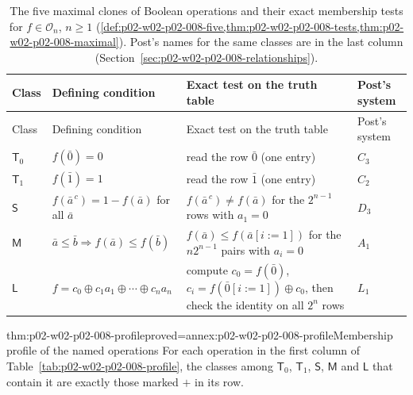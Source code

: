 \begingroup\small
\begin{longtable}{@{}p{}p{}p{}p{}@{}}
\caption{The five maximal clones of Boolean operations and their exact
membership tests for \(f\in\mathcal O_n\), \(n\geq1\)
(\cref{def:p02-w02-p02-008-five,thm:p02-w02-p02-008-tests,thm:p02-w02-p02-008-maximal}).
Post's names for the same classes are in the last column
(Section~\ref{sec:p02-w02-p02-008-relationships}).}
\label{tab:p02-w02-p02-008-tests}\\
\toprule
Class & Defining condition & Exact test on the truth table & Post's system \\
\midrule\endfirsthead
\toprule
Class & Defining condition & Exact test on the truth table & Post's system \\
\midrule\endhead
\(\mathsf T_0\) & \(f(\bar0)=0\) & read the row \(\bar0\) (one entry) & \(C_3\) \\
\(\mathsf T_1\) & \(f(\bar1)=1\) & read the row \(\bar1\) (one entry) & \(C_2\) \\
\(\mathsf S\) & \(f(\bar a^{\,c})=1-f(\bar a)\) for all \(\bar a\)
 & \(f(\bar a^{\,c})\neq f(\bar a)\) for the \(2^{n-1}\) rows with
   \(a_1=0\) & \(D_3\) \\
\(\mathsf M\) & \(\bar a\leq\bar b\Rightarrow f(\bar a)\leq f(\bar b)\)
 & \(f(\bar a)\leq f(\bar a[i{:=}1])\) for the \(n2^{n-1}\) pairs with
   \(a_i=0\) & \(A_1\) \\
\(\mathsf L\) & \(f=c_0\oplus c_1a_1\oplus\cdots\oplus c_na_n\)
 & compute \(c_0=f(\bar0)\), \(c_i=f(\bar0[i{:=}1])\oplus c_0\), then
   check the identity on all \(2^n\) rows & \(L_1\) \\
\bottomrule
\end{longtable}
\endgroup

\begin{hblemma}{thm:p02-w02-p02-008-profile}{proved=annex:p02-w02-p02-008-profile}{Membership profile of the named operations}
For each operation in the first column of
Table~\ref{tab:p02-w02-p02-008-profile}, the classes among \(\mathsf T_0\), \(\mathsf T_1\),
\(\mathsf S\), \(\mathsf M\) and \(\mathsf L\) that contain it are
exactly those marked \(+\) in its row.
\end{hblemma}

